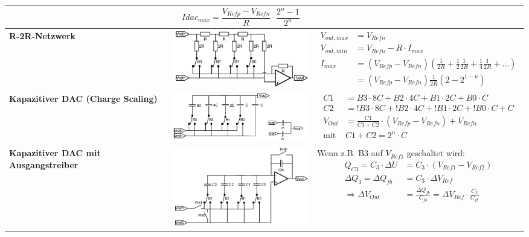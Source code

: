 \begin{longtable}{|>{\bfseries}p{3cm}|c|p{8.6cm}|}
	& \[
		Idac_{max}=\frac{V_{Refp}-V_{Refn}}{R} \cdot \frac{2^n-1}{2^n}
	  \]
	\\ \hline
	R-2R-Netzwerk \hartl{462}
	& \includegraphics[width=6cm, valign=t]{./pictures/r2rnetzwerk.png}
	& {
	\begin{align*}
		V_{out,max} &= V_{Refn} \\
		V_{out,min} &= V_{Refn} - R \cdot I_{max}\\
		I_{max}		&= (V_{Refp} - V_{Refn}) (\frac{1}{2R} + \frac{1}{2}\frac{1}{2R} + \frac{1}{4} \frac{1}{2R} + \ldots) \\
					&= (V_{Refp} - V_{Refn})\frac{1}{2R}(2-2^{1-n})
	\end{align*}}
	\\ \hline
	Kapazitiver DAC (Charge Scaling)
	& \includegraphics[width=6cm, valign=t]{./pictures/kapazitiverDAC.png}
	& {\begin{align*}
		C1	&= B3 \cdot 8C+B2 \cdot 4C+ B1 \cdot 2C+B0 \cdot C \\
		C2	&= !B3 \cdot 8C+!B2 \cdot 4C+ !B1 \cdot 2C+!B0 \cdot C+C \\
		V_{Out}& =\frac{C1}{C1+C2}\cdot (V_{Refp}-V_{Refn}) + V_{Refn}\\
		\text{mit } & C1+C2=2^n\cdot C
	  \end{align*}}
	\\ \hline
    Kapazitiver DAC mit Ausgangstreiber
    & \includegraphics[width=6cm, valign=t]{./pictures/kapazitiverDACmitAmp.png}
    & {Wenn z.B. B3 auf $V_{Ref1}$ geschaltet wird:\newline
      \begin{align*}
          Q_{C3} = C_3 \cdot \Delta U &= C_3 \cdot (V_{Ref1}-V_{Ref2})\\
          \Delta Q_3 = \Delta Q_{fb} &= C_3 \cdot \Delta V_{Ref}\\
          \Rightarrow \Delta V_{Out} &= \frac{\Delta Q_{fb}}{C_{fb}} = \Delta V_{Ref} \cdot \frac{C_3}{C_{fb}}
      \end{align*}}
    \\ \hline
\end{longtable}


